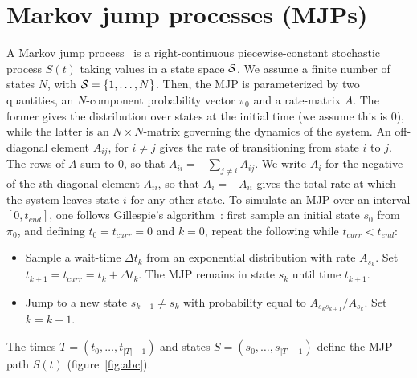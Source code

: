 \section{Markov jump processes (MJPs)} 
A Markov jump process~\citep{Cinlar1975} is a right-continuous piecewise-constant stochastic process $S(t)$ taking values in a state space ${\mathcal S}$. %
We assume a finite number of states $N$, with ${\mathcal S} = \{1,\ldots,N\}$. 
Then, the MJP is parameterized by two quantities, an $N$-component probability vector $\pi_0$ and a rate-matrix $A$. 
The former gives the distribution over states at the initial time (we assume this is $0$), while the latter is an $N \times N$-matrix governing the dynamics of the system.  
An off-diagonal element $A_{ij}$, for $i \neq j$ gives the rate of transitioning from state $i$ to $j$. 
The rows of $A$ sum to $0$, so that $A_{ii}=-\sum_{j \neq i} A_{ij}  $. 
We write $A_i$ for the negative of the $i$th diagonal element $A_{ii}$, so that $A_i = -A_{ii}$ gives the total rate at which the system leaves state $i$ for any other state.
To simulate an MJP over an interval $[0,t_{end}]$, one follows Gillespie's algorithm~\citep{gillespie97}: 
first sample an initial state $s_0$ from $\pi_0$, and defining $t_0 = t_{curr} = 0$ and $k = 0$, repeat the following while $t_{curr} < t_{end}$:
\begin{itemize}
  \item Sample a wait-time $\Delta t_k$ from an exponential distribution with rate $A_{s_k}$.  
    Set $t_{k+1} = t_{curr} = t_{k} + \Delta t_k$. 
    The MJP remains in state $s_k$ until time $t_{k+1}$.
  \item Jump to a new state $s_{k+1} \neq s_k$ with probability equal to $A_{s_ks_{k+1}}/A_{s_k}$. Set $k=k+1$.
\end{itemize}
The times $T=(t_0, \dotsc, t_{|T| - 1})$ and states $S=(s_0, \dotsc, s_{|T| - 1 })$ define the MJP path $S(t)$ (figure~\ref{fig:abc}).

